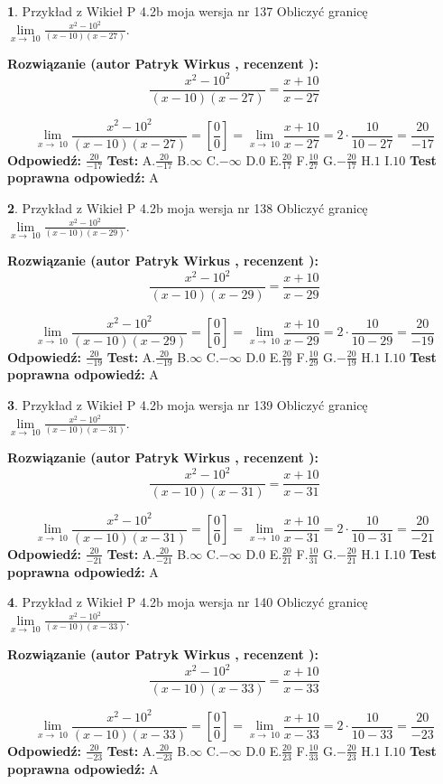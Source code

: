 \documentclass[12pt, a4paper]{article}
\theoremstyle{definition} %
\newtheorem{zad}{}
\newcommand{\zadStart}[1]{\begin{zad}#1\newline}
\newcommand{\zadStop}{\end{zad}}
\newcommand{\rozwStart}[2]{\noindent \textbf{Rozwiązanie (autor #1 , recenzent #2): }\newline}
\newcommand{\rozwStop}{\newline}
\newcommand{\odpStart}{\noindent \textbf{Odpowiedź:}\newline}
\newcommand{\odpStop}{\newline}
\newcommand{\testStart}{\noindent \textbf{Test:}\newline}
\newcommand{\testStop}{\newline}
\newcommand{\kluczStart}{\noindent \textbf{Test poprawna odpowiedź:}\newline}
\newcommand{\kluczStop}{\newline}
\begin{document}
\zadStart{Przykład z Wikieł P 4.2b moja wersja nr 137}
Obliczyć granicę $\lim\limits_{x\to\ 10}\frac{x^{2}-10^{2}}{(x-10)(x-27)}$.
\zadStop
\rozwStart{Patryk Wirkus}{}
$$\frac{x^{2}-10^{2}}{(x-10)(x-27)}=\frac{x+10}{x-27}$$

$$\lim\limits_{x\to\ 10}\frac{x^{2}-10^{2}}{(x-10)(x-27)}=[\frac{0}{0}]=\lim\limits_{x\to\ 10}\frac{x+10}{x-27}=2 \cdot \frac{10}{10-27} = \frac{20}{-17}$$
\rozwStop
\odpStart
$\frac{20}{-17}$
\odpStop
\testStart
A.$\frac{20}{-17}$
B.$\infty$
C.$-\infty$
D.$0$
E.$\frac{20}{17}$
F.$\frac{10}{27}$
G.$-\frac{20}{17}$
H.$1$
I.$10$
\testStop
\kluczStart
A
\kluczStop



\zadStart{Przykład z Wikieł P 4.2b moja wersja nr 138}
Obliczyć granicę $\lim\limits_{x\to\ 10}\frac{x^{2}-10^{2}}{(x-10)(x-29)}$.
\zadStop
\rozwStart{Patryk Wirkus}{}
$$\frac{x^{2}-10^{2}}{(x-10)(x-29)}=\frac{x+10}{x-29}$$

$$\lim\limits_{x\to\ 10}\frac{x^{2}-10^{2}}{(x-10)(x-29)}=[\frac{0}{0}]=\lim\limits_{x\to\ 10}\frac{x+10}{x-29}=2 \cdot \frac{10}{10-29} = \frac{20}{-19}$$
\rozwStop
\odpStart
$\frac{20}{-19}$
\odpStop
\testStart
A.$\frac{20}{-19}$
B.$\infty$
C.$-\infty$
D.$0$
E.$\frac{20}{19}$
F.$\frac{10}{29}$
G.$-\frac{20}{19}$
H.$1$
I.$10$
\testStop
\kluczStart
A
\kluczStop



\zadStart{Przykład z Wikieł P 4.2b moja wersja nr 139}
Obliczyć granicę $\lim\limits_{x\to\ 10}\frac{x^{2}-10^{2}}{(x-10)(x-31)}$.
\zadStop
\rozwStart{Patryk Wirkus}{}
$$\frac{x^{2}-10^{2}}{(x-10)(x-31)}=\frac{x+10}{x-31}$$

$$\lim\limits_{x\to\ 10}\frac{x^{2}-10^{2}}{(x-10)(x-31)}=[\frac{0}{0}]=\lim\limits_{x\to\ 10}\frac{x+10}{x-31}=2 \cdot \frac{10}{10-31} = \frac{20}{-21}$$
\rozwStop
\odpStart
$\frac{20}{-21}$
\odpStop
\testStart
A.$\frac{20}{-21}$
B.$\infty$
C.$-\infty$
D.$0$
E.$\frac{20}{21}$
F.$\frac{10}{31}$
G.$-\frac{20}{21}$
H.$1$
I.$10$
\testStop
\kluczStart
A
\kluczStop



\zadStart{Przykład z Wikieł P 4.2b moja wersja nr 140}
Obliczyć granicę $\lim\limits_{x\to\ 10}\frac{x^{2}-10^{2}}{(x-10)(x-33)}$.
\zadStop
\rozwStart{Patryk Wirkus}{}
$$\frac{x^{2}-10^{2}}{(x-10)(x-33)}=\frac{x+10}{x-33}$$

$$\lim\limits_{x\to\ 10}\frac{x^{2}-10^{2}}{(x-10)(x-33)}=[\frac{0}{0}]=\lim\limits_{x\to\ 10}\frac{x+10}{x-33}=2 \cdot \frac{10}{10-33} = \frac{20}{-23}$$
\rozwStop
\odpStart
$\frac{20}{-23}$
\odpStop
\testStart
A.$\frac{20}{-23}$
B.$\infty$
C.$-\infty$
D.$0$
E.$\frac{20}{23}$
F.$\frac{10}{33}$
G.$-\frac{20}{23}$
H.$1$
I.$10$
\testStop
\kluczStart
A
\kluczStop
\end{document}

